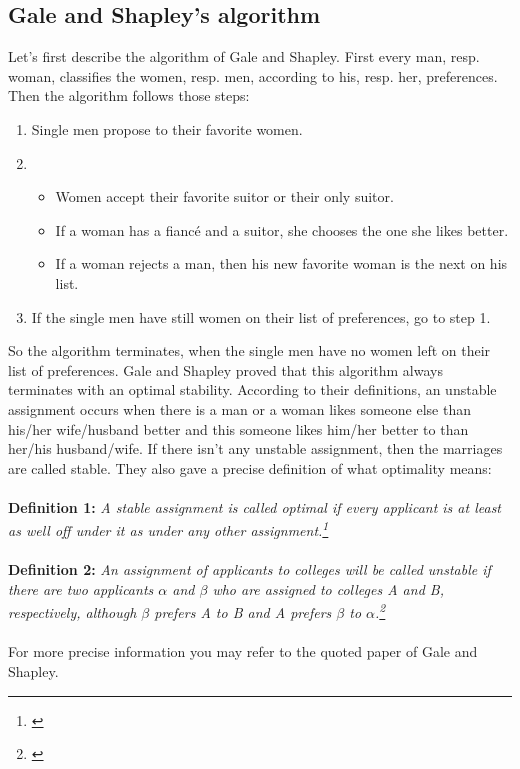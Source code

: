 \documentclass[11pt]{article}
\begin{document}
\subsection{Gale and Shapley’s algorithm}

Let’s first describe the algorithm of Gale and Shapley.
First every man, resp. woman, classifies the women, resp. men, according to his, resp. her, preferences. Then the algorithm follows those steps:
\begin{enumerate}
  \item Single men propose to their favorite women.
  \item
  \begin{itemize}
    \item Women accept their favorite suitor or their only suitor.
    \item If a woman has a fiancé and a suitor, she chooses the one she likes better.
    \item If a woman rejects a man, then his new favorite woman is the next on his list.
  \end{itemize}
  \item If the single men have still women on their list of preferences, go to step 1.
\end{enumerate}
So the algorithm terminates, when the single men have no women left on their list of preferences.
Gale and Shapley proved that this algorithm always terminates with an optimal stability. According to 
their definitions, an unstable assignment occurs when there is a man or a woman likes someone else 
than his/her wife/husband better and this someone likes him/her better to than her/his 
husband/wife. If there isn’t any unstable assignment, then the marriages are called stable. They also 
gave a precise definition of what optimality means:
\\
\\
\textbf{Definition 1: }\textit{A stable assignment is called optimal if every applicant is at
least as well off under it as under any other assignment.\footnote{\citet{1962}}}
\label{eq:stable}
\\
\\
\textbf{Definition 2: }\textit{An assignment of applicants to colleges will be called unstable if there are two applicants
 $\alpha$ and $\beta$ who are assigned to colleges A and B, respectively, although $\beta$ prefers A to B and A prefers $\beta$
  to $\alpha$.\footnote{\citet{1962}}}
\label{eq:2}
\\
\\
For more precise information you may refer to the quoted paper of Gale and Shapley.
\end{document}
